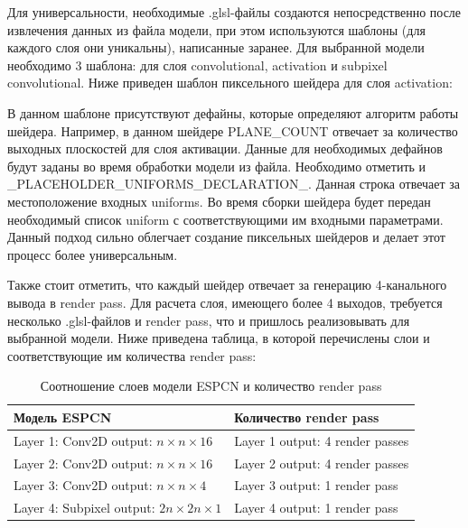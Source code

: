 \documentclass[a4paper,14pt]{extreport}
\begin{document}
            Для универсальности, необходимые .glsl-файлы создаются непосредственно после извлечения данных из файла модели, при этом используются шаблоны (для каждого слоя они уникальны), написанные заранее. Для выбранной модели необходимо 3 шаблона: для слоя convolutional, activation и subpixel convolutional. Ниже приведен шаблон пиксельного шейдера для слоя activation:

            

            В данном шаблоне присутствуют дефайны, которые определяют алгоритм работы шейдера. Например, в данном шейдере PLANE\_COUNT отвечает за количество выходных плоскостей для слоя активации. Данные для необходимых дефайнов будут заданы во время обработки модели из файла. Необходимо отметить и \_PLACEHOLDER\_UNIFORMS\_DECLARATION\_. Данная строка отвечает за местоположение входных uniforms. Во время сборки шейдера будет передан необходимый список uniform с соответствующими им входными параметрами. Данный подход сильно облегчает создание пиксельных шейдеров и делает этот процесс более универсальным.
            
            Также стоит отметить, что каждый шейдер отвечает за генерацию 4-канального вывода в render pass. Для расчета слоя, имеющего более 4 выходов, требуется несколько .glsl-файлов и render pass, что и пришлось реализовывать для выбранной модели. Ниже приведена таблица, в которой перечислены слои и соответствующие им количества render pass:

            \begin{table}[H]
                \begin{center}
                    \begin{tabular}{|l|l|}
                        \hline
                        Модель ESPCN & Количество render pass \\
                        \hline
                        Layer 1: Conv2D output: $n \times n \times 16$ & Layer 1 output: 4 render passes \\
                        \hline
                        Layer 2: Conv2D output: $n \times n \times 16$ & Layer 2 output: 4 render passes \\
                        \hline
                        Layer 3: Conv2D output: $n \times n \times 4$ & Layer 3 output: 1 render pass \\
                        \hline
                        Layer 4: Subpixel output: $2n \times 2n \times 1$ & Layer 4 output: 1 render pass \\
                        \hline
                    \end{tabular}
                \end{center}
                \caption{\label{tab:canonsummary}Соотношение слоев модели ESPCN и количество render pass}
            \end{table}
\end{document}
